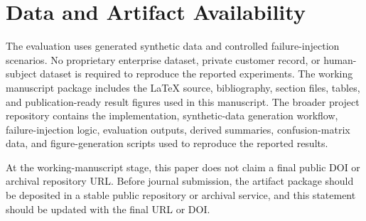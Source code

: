 \documentclass[conference]{IEEEtran}
\begin{document}











\section*{Data and Artifact Availability}

The evaluation uses generated synthetic data and controlled failure-injection scenarios. No proprietary enterprise dataset, private customer record, or human-subject dataset is required to reproduce the reported experiments. The working manuscript package includes the LaTeX source, bibliography, section files, tables, and publication-ready result figures used in this manuscript. The broader project repository contains the implementation, synthetic-data generation workflow, failure-injection logic, evaluation outputs, derived summaries, confusion-matrix data, and figure-generation scripts used to reproduce the reported results.

At the working-manuscript stage, this paper does not claim a final public DOI or archival repository URL. Before journal submission, the artifact package should be deposited in a stable public repository or archival service, and this statement should be updated with the final URL or DOI.



\end{document}
